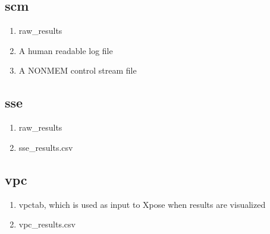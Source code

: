 \subsection{scm}
\begin{enumerate}
\item raw\_results
\item A human readable log file
\item A NONMEM control stream file
\end{enumerate}
\subsection{sse}
\begin{enumerate}
\item raw\_results 
\item sse\_results.csv 
\end{enumerate}
\subsection{vpc}
\begin{enumerate}
\item vpctab, which is used as input to Xpose when results are visualized
\item vpc\_results.csv 
\end{enumerate}


